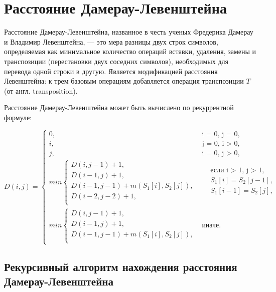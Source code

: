 \section{Расстояние Дамерау-Левенштейна}
Расстояние Дамерау-Левенштейна, названное в честь ученых Фредерика Дамерау и Владимир Левенштейна, --- это мера разницы двух строк символов, определяемая как минимальное количество операций вставки, удаления, замены и транспозиции (перестановки двух соседних символов), необходимых для перевода одной строки в другую. Является модификацией расстояния Левенштейна: к трем базовым операциям добавляется операция транспозиции $T$ (от англ. transposition).

Расстояние Дамерау-Левенштейна может быть вычислено по рекуррентной формуле:

\begin{equation}
	\label{eq:DL}
	D(i, j) = 
	\begin{cases}
		0, &\text{i = 0, j = 0,}\\
		i, &\text{j = 0, i > 0,}\\
		j, &\text{i = 0, j > 0,}\\
		min \begin{cases}
			D(i, j - 1) + 1,\\
			D(i - 1, j) + 1,\\
			D(i - 1, j - 1) + m(S_{1}[i], S_{2}[j]), \\
			D(i - 2, j - 2) + 1, \\
		\end{cases}
		& \begin{aligned}
			& \text{если i > 1, j > 1}, \\
			& S_{1}[i] = S_{2}[j - 1], \\
			& S_{1}[i - 1] = S_{2}[j], \\
		\end{aligned}\\
		min \begin{cases}
			D(i, j - 1) + 1,\\
			D(i - 1, j) + 1, \\
			D(i - 1, j - 1) + m(S_{1}[i], S_{2}[j]), \\
		\end{cases}
		 & \text{иначе.}
	\end{cases}
\end{equation}

\subsection{Рекурсивный алгоритм нахождения расстояния Дамерау-Левенштейна}

